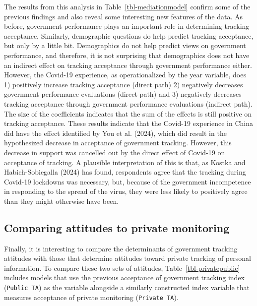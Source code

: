 \documentclass[
  letterpaper,
  DIV=11,
  numbers=noendperiod]{scrartcl}
\begin{document}
The results from this analysis in Table~\ref{tbl-mediationmodel} confirm
some of the previous findings and also reveal some interesting new
features of the data. As before, government performance plays an
important role in determining tracking acceptance. Similarly,
demographic questions do help predict tracking acceptance, but only by a
little bit. Demographics do not help predict views on government
performance, and therefore, it is not surprising that demographics does
not have an indirect effect on tracking acceptance through government
performance either. However, the Covid-19 experience, as operationalized
by the year variable, does 1) positively increase tracking acceptance
(direct path) 2) negatively decreases government performance evaluations
(direct path) and 3) negatively decreases tracking acceptance through
government performance evaluations (indirect path). The size of the
coefficients indicates that the sum of the effects is still positive on
tracking acceptance. These results indicate that the Covid-19 experience
in China did have the effect identified by You et al. (2024), which did
result in the hypothesized decrease in acceptance of government
tracking. However, this decrease in support was cancelled out by the
direct effect of Covid-19 on acceptance of tracking. A plausible
interpretation of this is that, as Kostka and Habich-Sobiegalla (2024)
has found, respondents agree that the tracking during Covid-19 lockdowns
was necessary, but, because of the government incompetence in responding
to the spread of the virus, they were less likely to positively agree
than they might otherwise have been.

\subsection{Comparing attitudes to private
monitoring}\label{comparing-attitudes-to-private-monitoring}

Finally, it is interesting to compare the determinants of government
tracking attitudes with those that determine attitudes toward private
tracking of personal information. To compare these two sets of
attitudes, Table~\ref{tbl-privatepublic} includes models that use the
previous acceptance of government tracking index (\texttt{Public\ TA})
as the variable alongside a similarly constructed index variable that
measures acceptance of private monitoring (\texttt{Private\ TA}).
\end{document}
